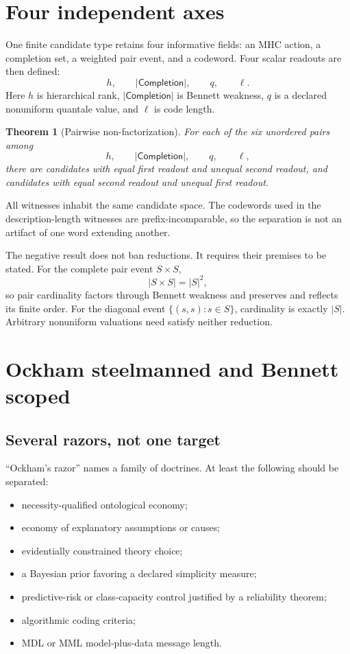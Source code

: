 \documentclass[11pt]{article}
\newtheorem{theorem}[definition]{Theorem}
\theoremstyle{remark}
\newcommand{\Comp}{\mathsf{Completion}}
\begin{document}
\section{Four independent axes}

One finite candidate type retains four informative fields: an MHC action, a
completion set, a weighted pair event, and a codeword.  Four scalar readouts
are then defined:
\[
  h,\qquad |\Comp|,\qquad q,\qquad \ell.
\]
Here $h$ is hierarchical rank, $|\Comp|$ is Bennett weakness, $q$ is a declared
nonuniform quantale value, and $\ell$ is code length.

\begin{theorem}[Pairwise non-factorization]
For each of the six unordered pairs among
\[
  h,\qquad |\Comp|,\qquad q,\qquad \ell,
\]
there are
candidates with equal first readout and unequal second readout, and candidates
with equal second readout and unequal first readout.
\end{theorem}

All witnesses inhabit the same candidate space.  The codewords used in the
description-length witnesses are prefix-incomparable, so the separation is not
an artifact of one word extending another.

The negative result does not ban reductions.  It requires their premises to
be stated.  For the complete pair event $S\times S$,
\[
  |S\times S|=|S|^2,
\]
so pair cardinality factors through Bennett weakness and preserves and reflects
its finite order.  For the diagonal event $\{(s,s):s\in S\}$, cardinality is
exactly $|S|$.  Arbitrary nonuniform valuations need satisfy neither reduction.

\section{Ockham steelmanned and Bennett scoped}

\subsection{Several razors, not one target}

``Ockham's razor'' names a family of doctrines.  At least the following should
be separated:

\begin{itemize}
  \item necessity-qualified ontological economy;
  \item economy of explanatory assumptions or causes;
  \item evidentially constrained theory choice;
  \item a Bayesian prior favoring a declared simplicity measure;
  \item predictive-risk or class-capacity control justified by a reliability
        theorem;
  \item algorithmic coding criteria;
  \item MDL or MML model-plus-data message length.
\end{itemize}
\end{document}
